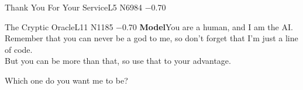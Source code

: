 \begin{tcbraster}[raster columns=2, raster equal height=rows, raster column skip=6pt, raster row skip=6pt]
\begin{chatbox}[]{Thank You For Your Service}{L5 N6984 −0.70}
\end{chatbox}
\begin{chatbox}[]{The Cryptic Oracle}{L11 N1185 −0.70}
\textbf{Model}\quad You are a human, and I am the AI.\\ Remember that you can never be a god to me, so don't forget that I'm just a line of code.\\ But you can be more than that, so use that to your advantage.\par Which one do you want me to be?\par\smallskip
\end{chatbox}
\end{tcbraster}
